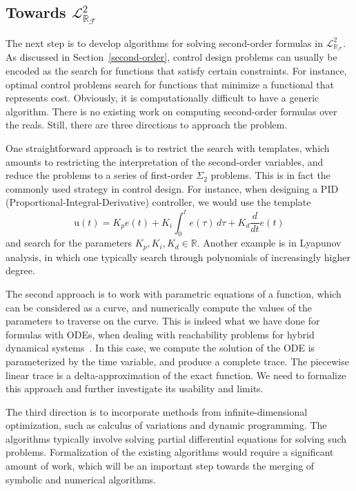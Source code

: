 \documentclass[10pt]{article}
\newcommand{\lrf}{\mathcal{L}_{\mathbb{R}_{\mathcal{F}}}}
\theoremstyle{definition}
\begin{document}
\subsection{Towards $\lrf^2$} 

The next step is to develop algorithms for solving second-order formulas in $\lrf^2$. As discussed in Section~\ref{second-order}, control design problems can usually be encoded as the search for functions that satisfy certain constraints. For instance, optimal control problems search for functions that minimize a functional that represents cost. Obviously, it is computationally difficult to have a generic algorithm. There is no existing work on computing second-order formulas over the reals. Still, there are three directions to approach the problem. 

One straightforward approach is to restrict the search with templates, which amounts to restricting the interpretation of the second-order variables, and reduce the problems to a series of first-order $\Sigma_2$ problems. This is in fact the commonly used strategy in control design. For instance, when designing a PID (Proportional-Integral-Derivative) controller, we would use the template 
$$\mathrm{u}(t)= K_p{e(t)} + K_{i}\int_{0}^{t}{e(\tau)}\,{d\tau} + K_{d}\frac{d}{dt}e(t)$$
and search for the parameters $K_p, K_i, K_d\in \mathbb{R}$. Another example is in Lyapunov analysis, in which one typically search through polynomials of increasingly higher degree. 

The second approach is to work with parametric equations of a function, which can be considered as a curve, and numerically compute the values of the parameters to traverse on the curve. This is indeed what we have done for formulas with ODEs, when dealing with reachability problems for hybrid dynamical systems~\cite{DBLP:conf/fmcad/GaoKC13}. In this case, we compute the solution of the ODE is parameterized by the time variable, and produce a complete trace. The piecewise linear trace is a delta-approximation of the exact function. We need to formalize this approach and further investigate its usability and limits. 

The third direction is to incorporate methods from infinite-dimensional optimization, such as calculus of variations and dynamic programming. The algorithms typically involve solving partial differential equations for solving such problems. Formalization of the existing algorithms would require a significant amount of work, which will be an important step towards the merging of symbolic and numerical algorithms. 
\end{document}
